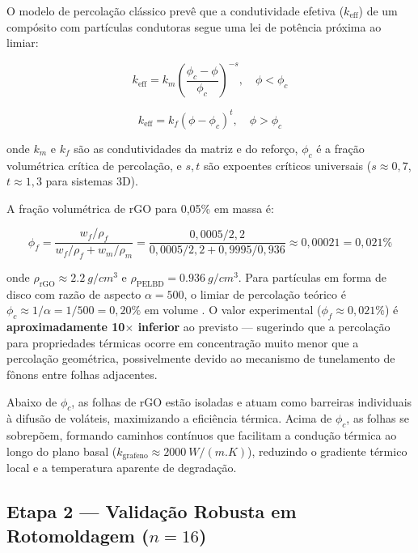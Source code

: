 \documentclass[12pt,a4paper,twoside]{article}
\begin{document}
O modelo de percolação clássico prevê que a condutividade efetiva ($k_{\text{eff}}$) de um compósito com partículas condutoras segue uma lei de potência próxima ao limiar:

\begin{equation}
k_{\text{eff}} = k_m \left(\frac{\phi_c - \phi}{\phi_c}\right)^{-s}, \quad \phi < \phi_c
\label{eq:percolation_below}
\end{equation}

\begin{equation}
k_{\text{eff}} = k_f (\phi - \phi_c)^t, \quad \phi > \phi_c
\label{eq:percolation_above}
\end{equation}

onde $k_m$ e $k_f$ são as condutividades da matriz e do reforço, $\phi_c$ é a fração volumétrica crítica de percolação, e $s, t$ são expoentes críticos universais ($s \approx 0,7$, $t \approx 1,3$ para sistemas 3D).

A fração volumétrica de rGO para 0,05\% em massa é:

\begin{equation}
\phi_f = \frac{w_f / \rho_f}{w_f / \rho_f + w_m / \rho_m} = \frac{0,0005 / 2,2}{0,0005/2,2 + 0,9995/0,936} \approx 0,00021 = 0,021\%
\label{eq:volume_fraction}
\end{equation}

onde $\rho_{\text{rGO}} \approx \SI{2,2}{g/cm^3}$ e $\rho_{\text{PELBD}} = \SI{0,936}{g/cm^3}$. Para partículas em forma de disco com razão de aspecto $\alpha = 500$, o limiar de percolação teórico é $\phi_c \approx 1/\alpha = 1/500 = 0,20\%$ em volume \cite{Celzard1996}. O valor experimental ($\phi_f \approx 0,021\%$) é \textbf{aproximadamente 10$\times$ inferior} ao previsto — sugerindo que a percolação para propriedades térmicas ocorre em concentração muito menor que a percolação geométrica, possivelmente devido ao mecanismo de tunelamento de fônons entre folhas adjacentes.

Abaixo de $\phi_c$, as folhas de rGO estão isoladas e atuam como barreiras individuais à difusão de voláteis, maximizando a eficiência térmica. Acima de $\phi_c$, as folhas se sobrepõem, formando caminhos contínuos que facilitam a condução térmica ao longo do plano basal ($k_{\text{grafeno}} \approx \SI{2000}{W/(m.K)}$), reduzindo o gradiente térmico local e a temperatura aparente de degradação.

\subsection{Etapa 2 — Validação Robusta em Rotomoldagem ($n=16$)}
\end{document}
